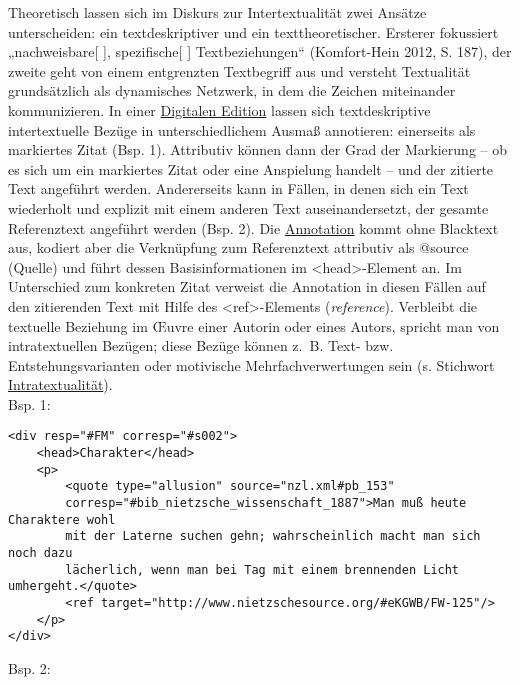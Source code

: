 \documentclass{article}
\begin{document}
    Theoretisch lassen sich im Diskurs zur Intertextualität zwei Ansätze
                  unterscheiden: ein textdeskriptiver und ein texttheoretischer. Ersterer fokussiert
                  „nachweisbare[ ], spezifische[ ] Textbeziehungen“ (Komfort-Hein 2012, S. 187), der zweite geht von einem entgrenzten
                  Textbegriff aus und versteht Textualität grundsätzlich als dynamisches Netzwerk,
                  in dem die Zeichen miteinander kommunizieren. In einer \href{http://gams.uni-graz.at/o:konde.59}{Digitalen Edition} lassen sich textdeskriptive
                  intertextuelle Bezüge in unterschiedlichem Ausmaß annotieren: einerseits als
                  markiertes Zitat (Bsp. 1). Attributiv können dann der Grad der Markierung – ob es
                  sich um ein markiertes Zitat oder eine Anspielung handelt – und der zitierte Text
                  angeführt werden. Andererseits kann in Fällen, in denen sich ein Text wiederholt
                  und explizit mit einem anderen Text auseinandersetzt, der gesamte Referenztext
                  angeführt werden (Bsp. 2). Die \href{http://gams.uni-graz.at/o:konde.17}{Annotation} kommt ohne Blacktext aus, kodiert aber die Verknüpfung zum
                  Referenztext attributiv als @source (Quelle) und führt dessen Basisinformationen im <head>-Element an. Im Unterschied zum konkreten
                  Zitat verweist die Annotation in diesen Fällen auf den zitierenden Text mit Hilfe
                  des <ref>-Elements (\emph{reference}). Verbleibt die textuelle Beziehung im Œuvre einer Autorin oder
                  eines Autors, spricht man von intratextuellen Bezügen; diese Bezüge können z. B.
                  Text- bzw. Entstehungsvarianten oder motivische Mehrfachverwertungen sein (s.
                  Stichwort \href{http://gams.uni-graz.at/o:konde.21}{Intratextualität}).\\
            
        Bsp. 1:\\
            
        \begin{verbatim}<div resp="#FM" corresp="#s002">
    <head>Charakter</head>
    <p>
        <quote type="allusion" source="nzl.xml#pb_153"
        corresp="#bib_nietzsche_wissenschaft_1887">Man muß heute Charaktere wohl 
        mit der Laterne suchen gehn; wahrscheinlich macht man sich noch dazu 
        lächerlich, wenn man bei Tag mit einem brennenden Licht umhergeht.</quote>
        <ref target="http://www.nietzschesource.org/#eKGWB/FW-125"/>
    </p>
</div>\end{verbatim}Bsp. 2:\\
            
\end{document}
